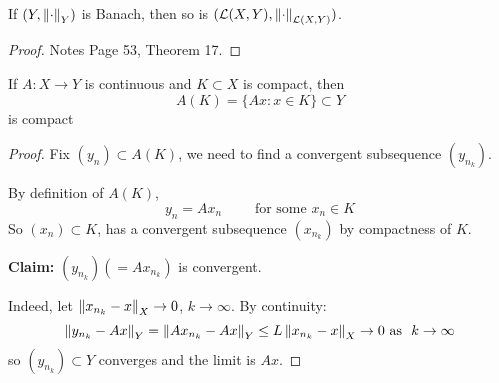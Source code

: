\documentclass{article}
\begin{document}
\begin{theorem}
    If $(Y, \left\|{\cdot}\right\|_Y)$ is Banach, then so is $(\mathcal{L}(X, Y), \left\|{\cdot}\right\|_{\mathcal{L}(X, Y)})$.  
\end{theorem}
\begin{proof}
    Notes Page 53, Theorem 17.
\end{proof}

\begin{corollary}
    If $A:X \to Y$ is continuous and $K\subset X$ is compact, then  
    $$
    A(K) = \{Ax: x\in K\} \subset Y
    $$
    is compact
\end{corollary}
\begin{proof}
    Fix $(y_n) \subset A(K)$, we need to find a convergent subsequence $(y_{n_k})$.  

    By definition of $A(K)$,  
    $$
    y_n = Ax_n \qquad \text{\ for\ some\ }x_n \in K
    $$  
    So $(x_n) \subset K$, has a convergent subsequence $(x_{n_k})$ by compactness of $K$.  

    \textbf{Claim:} $(y_{n_k})(=Ax_{n_k})$ is convergent.  

    Indeed, let $\left\|{x_{n_k}-x}\right\|_X \to 0$, $k\to \infty$. By continuity:  
    $$
    \left\|{y_{n_k}-Ax}\right\|_Y = \left\|{Ax_{n_k}-Ax}\right\|_Y \leq L \left\|{x_{n_k}-x}\right\|_X \to 0 \text{\ as \ } k \to \infty
    $$
    so $(y_{n_k}) \subset Y$ converges and the limit is $Ax$.
\end{proof}
\end{document}
